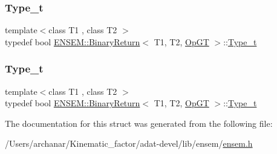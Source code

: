 \mbox{\label{structENSEM_1_1BinaryReturn_3_01T1_00_01T2_00_01OpGT_01_4_a421698302c7e07764108c7954de9f1c8}} 
\subsubsection{\texorpdfstring{Type\_t}{Type\_t}\hspace{0.1cm}{\footnotesize\ttfamily [2/3]}}
{\footnotesize\ttfamily template$<$class T1 , class T2 $>$ \\
typedef bool \mbox{\hyperlink{structENSEM_1_1BinaryReturn}{E\+N\+S\+E\+M\+::\+Binary\+Return}}$<$ T1, T2, \mbox{\hyperlink{structENSEM_1_1OpGT}{Op\+GT}} $>$\+::\mbox{\hyperlink{structENSEM_1_1BinaryReturn_3_01T1_00_01T2_00_01OpGT_01_4_a421698302c7e07764108c7954de9f1c8}{Type\+\_\+t}}}

\mbox{\label{structENSEM_1_1BinaryReturn_3_01T1_00_01T2_00_01OpGT_01_4_a421698302c7e07764108c7954de9f1c8}} 
\subsubsection{\texorpdfstring{Type\_t}{Type\_t}\hspace{0.1cm}{\footnotesize\ttfamily [3/3]}}
{\footnotesize\ttfamily template$<$class T1 , class T2 $>$ \\
typedef bool \mbox{\hyperlink{structENSEM_1_1BinaryReturn}{E\+N\+S\+E\+M\+::\+Binary\+Return}}$<$ T1, T2, \mbox{\hyperlink{structENSEM_1_1OpGT}{Op\+GT}} $>$\+::\mbox{\hyperlink{structENSEM_1_1BinaryReturn_3_01T1_00_01T2_00_01OpGT_01_4_a421698302c7e07764108c7954de9f1c8}{Type\+\_\+t}}}



The documentation for this struct was generated from the following file\+:\begin{DoxyCompactItemize}
\item 
/\+Users/archanar/\+Kinematic\+\_\+factor/adat-\/devel/lib/ensem/\mbox{\hyperlink{adat-devel_2lib_2ensem_2ensem_8h}{ensem.\+h}}\end{DoxyCompactItemize}
